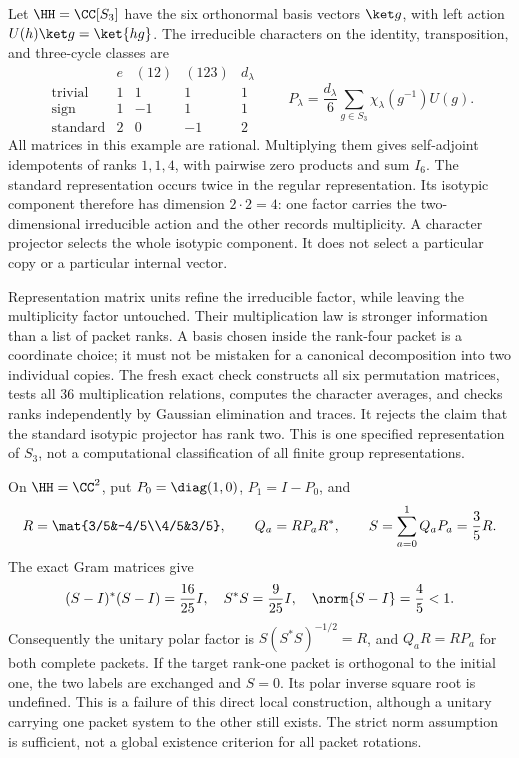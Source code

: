 Let $\HH=\CC[S_3]$ have the six orthonormal basis vectors $\ket g$, with left action $U(h)\ket g=\ket{hg}$. The irreducible characters on the identity, transposition, and three-cycle classes are
\[
\begin{array}{c|rrr|r}
 & e & (12)&(123)&d_\lambda\\\hline
\text{trivial}&1&1&1&1\\
\text{sign}&1&-1&1&1\\
\text{standard}&2&0&-1&2
\end{array}
\qquad
P_\lambda=\frac{d_\lambda}{6}\sum_{g\in S_3}\chi_\lambda(g^{-1})U(g).
\]
All matrices in this example are rational. Multiplying them gives self-adjoint idempotents of ranks $1,1,4$, with pairwise zero products and sum $I_6$.
The standard representation occurs twice in the regular representation. Its isotypic component therefore has dimension $2\cdot2=4$: one factor carries the two-dimensional irreducible action and the other records multiplicity. A character projector selects the whole isotypic component. It does not select a particular copy or a particular internal vector.

Representation matrix units refine the irreducible factor, while leaving the multiplicity factor untouched. Their multiplication law is stronger information than a list of packet ranks. A basis chosen inside the rank-four packet is a coordinate choice; it must not be mistaken for a canonical decomposition into two individual copies.
The fresh exact check constructs all six permutation matrices, tests all $36$ multiplication relations, computes the character averages, and checks ranks independently by Gaussian elimination and traces. It rejects the claim that the standard isotypic projector has rank two. This is one specified representation of $S_3$, not a computational classification of all finite group representations.

On $\HH=\CC^2$, put $P_0=\diag(1,0)$, $P_1=I-P_0$, and
\[
R=\mat{3/5&-4/5\\4/5&3/5},\qquad Q_a=RP_aR^*,
\qquad S=\sum_{a=0}^1Q_aP_a=\frac35R.
\]
The exact Gram matrices give
\[
(S-I)^*(S-I)=\frac{16}{25}I,\quad S^*S=\frac9{25}I,
\quad\norm{S-I}=\frac45<1.
\]
Consequently the unitary polar factor is $S(S^*S)^{-1/2}=R$, and $Q_aR=RP_a$ for both complete packets.
If the target rank-one packet is orthogonal to the initial one, the two labels are exchanged and $S=0$. Its polar inverse square root is undefined. This is a failure of this direct local construction, although a unitary carrying one packet system to the other still exists. The strict norm assumption is sufficient, not a global existence criterion for all packet rotations.


